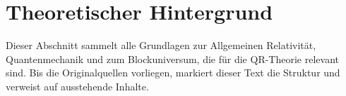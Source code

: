 \section{Theoretischer Hintergrund}
Dieser Abschnitt sammelt alle Grundlagen zur Allgemeinen Relativit\"at, Quantenmechanik
und zum Blockuniversum, die f\"ur die QR-Theorie relevant sind. Bis die Originalquellen
vorliegen, markiert dieser Text die Struktur und verweist auf ausstehende Inhalte.
